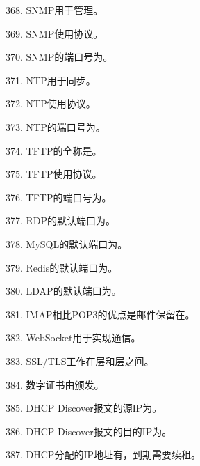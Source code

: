 368. SNMP用于\underline{\hspace{2cm}}管理。

369. SNMP使用\underline{\hspace{2cm}}协议。

370. SNMP的端口号为\underline{\hspace{2cm}}。

371. NTP用于\underline{\hspace{2cm}}同步。

372. NTP使用\underline{\hspace{2cm}}协议。

373. NTP的端口号为\underline{\hspace{2cm}}。

374. TFTP的全称是\underline{\hspace{4cm}}。

375. TFTP使用\underline{\hspace{2cm}}协议。

376. TFTP的端口号为\underline{\hspace{2cm}}。

377. RDP的默认端口为\underline{\hspace{2cm}}。

378. MySQL的默认端口为\underline{\hspace{2cm}}。

379. Redis的默认端口为\underline{\hspace{2cm}}。

380. LDAP的默认端口为\underline{\hspace{2cm}}。

381. IMAP相比POP3的优点是邮件保留在\underline{\hspace{2cm}}。

382. WebSocket用于实现\underline{\hspace{2cm}}通信。

383. SSL/TLS工作在\underline{\hspace{2cm}}层和\underline{\hspace{2cm}}层之间。

384. 数字证书由\underline{\hspace{2cm}}颁发。

385. DHCP Discover报文的源IP为\underline{\hspace{2cm}}。

386. DHCP Discover报文的目的IP为\underline{\hspace{2cm}}。

387. DHCP分配的IP地址有\underline{\hspace{2cm}}，到期需要续租。

